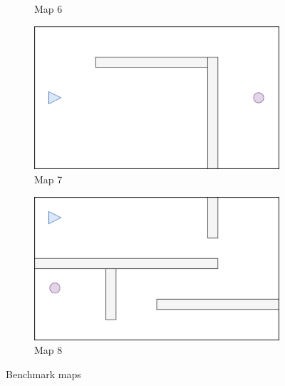 \documentclass[../main.tex]{subfiles}
\begin{document}
\begin{figure}[H]
\begin{subfigure}[b]{0.24\textwidth}
		\caption*{Map 6}
		\label{fig:map6}
	\end{subfigure}
	\hfill
	\begin{subfigure}[b]{0.24\textwidth}
		\centering
		\includegraphics[width=\textwidth]{IMAGES/part3/map7.png}
		\caption*{Map 7}
		\label{fig:map7}
	\end{subfigure}
	\hfill
	\begin{subfigure}[b]{0.24\textwidth}
		\centering
		\includegraphics[width=\textwidth]{IMAGES/part3/map8.png}
		\caption*{Map 8}
		\label{fig:map8}
	\end{subfigure}
	\caption{Benchmark maps}
	\label{fig:benchmark_maps}
\end{figure}
\end{document}
